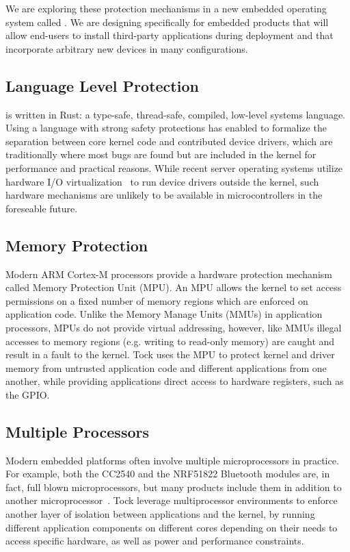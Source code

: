 We are exploring these protection mechanisms in a new embedded operating system
called \name. We are designing \name specifically for embedded products that
will allow end-users to install third-party applications during deployment and
that incorporate arbitrary new devices in many configurations.

\subsection{Language Level Protection}

\name is written in Rust: a type-safe, thread-safe, compiled, low-level systems
language. Using a language with strong safety protections has enabled \name to
formalize the separation between core kernel code and contributed device
drivers, which are traditionally where most bugs are found but are included in
the kernel for performance and practical reasons. While recent server operating
systems utilize hardware I/O virtualization~\cite{arrakis:osdi2014, ix:osdi2014}
to run device drivers outside the kernel, such hardware mechanisms are unlikely
to be available in microcontrollers in the foreseable future.

\subsection{Memory Protection}

Modern ARM Cortex-M processors provide a hardware protection mechanism called
Memory Protection Unit (MPU).  An MPU allows the kernel to set access
permissions on a fixed number of memory regions which are enforced on
application code. Unlike the Memory Manage Units (MMUs) in application
processors, MPUs do not provide virtual addressing, however, like MMUs illegal
accesses to memory regions (e.g. writing to read-only memory) are caught and
result in a fault to the kernel. Tock uses the MPU to protect kernel and driver
memory from untrusted application code and different applications from one
another, while providing applications direct access to hardware registers, such
as the GPIO.

\subsection{Multiple Processors}

Modern embedded platforms often involve multiple microprocessors in practice.
For example, both the CC2540 and the NRF51822 Bluetooth modules are, in fact,
full blown microprocessors, but many products include them in addition to
another microprocessor~. Tock leverage
multiprocessor environments to enforce another layer of isolation between
applications and the kernel, by running different application components on
different cores depending on their needs to access specific hardware, as well as
power and performance constraints.

